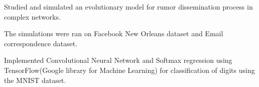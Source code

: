 \documentclass[]{deedy-resume-openfont}
\begin{document}
\begin{minipage}[t]{0.66\textwidth}
\begin{tightemize}
\item Studied and simulated an evolutionary model for rumor dissemination process in complex networks.
\item The simulations were ran on Facebook New Orleans dataset and Email correspondence dataset.
\end{tightemize}
\sectionsep

\vspace{\topsep} %
\begin{tightemize}\item Implemented Convolutional Neural Network and Softmax regression using TensorFlow(Google library for Machine Learning) for classification of digits using the MNIST dataset.
\end{tightemize}
\sectionsep








\end{minipage}
\end{document}
